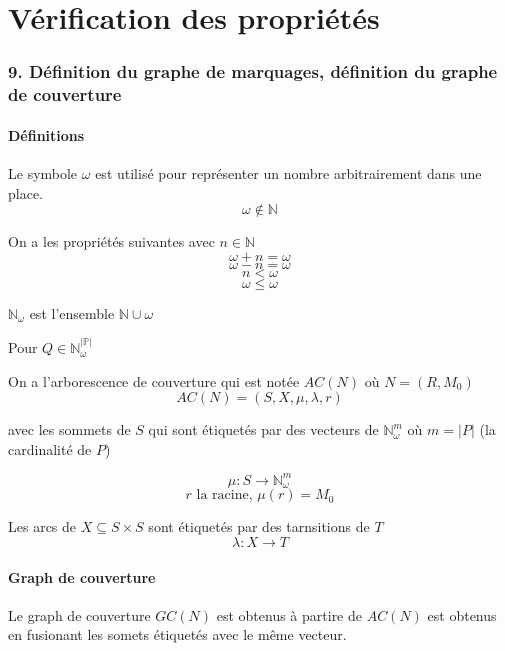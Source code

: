 \documentclass[12pt,a4paper,oneside]{article}
\begin{document}
\section{Vérification des propriétés}
	\subsubsection*{9. Définition du graphe de marquages, définition du graphe de couverture}
		\paragraph{Définitions}

		Le symbole $\omega$ est utilisé pour représenter un nombre arbitrairement dans une place.
		$$\omega \notin \mathbb{N}$$

		On a les propriétés suivantes avec $n \in \mathbb{N}$
		$$\omega + n = \omega$$
		$$\omega - n = \omega$$
		$$n < \omega$$
		$$\omega \leq \omega$$

		$\mathbb{N_\omega}$ est l'ensemble $\mathbb{N} \cup {\omega}$

		Pour $Q \in \mathbb{N_{\omega}^{|P|}}$

		On a l'arborescence de couverture qui est notée $AC(N)$ où $N = (R, M_0)$
		$$AC(N) = (S, X, \mu, \lambda, r)$$

		avec les sommets de $S$ qui sont étiquetés par des vecteurs de $\mathbb{N}_{\omega}^{m}$ où $m = |P|$ (la cardinalité de $P$)

		$$\mu : S \rightarrow \mathbb{N}_\omega^m$$
		$$r \textrm{ la racine,  } \mu(r)=M_0$$

		Les arcs de $X \subseteq S \times S$ sont étiquetés par des tarnsitions de $T$
		$$\lambda : X \rightarrow T$$

		\paragraph{Graph de couverture}

		Le graph de couverture $GC(N)$ est obtenus à partire de $AC(N)$ est obtenus en fusionant les
		somets étiquetés avec le même vecteur.
\end{document}
